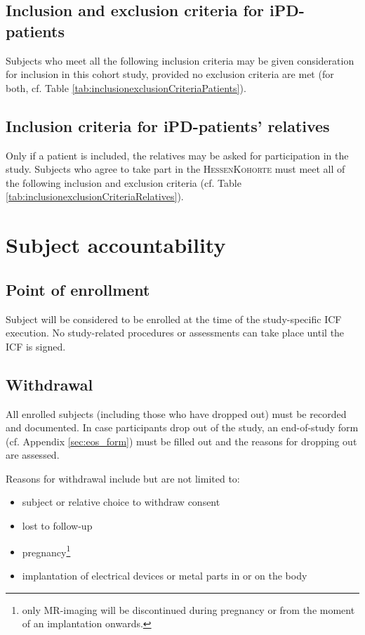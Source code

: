 \subsection{Inclusion and exclusion criteria for \ac{iPD}-patients}
\label{sec:inclusion_criteriaIPS}
Subjects who meet all the following inclusion criteria may be given consideration for inclusion in this cohort study, provided no exclusion criteria are met (for both, cf. Table \ref{tab:inclusionexclusionCriteriaPatients}).


\subsection{Inclusion criteria for \ac{iPD}-patients' relatives}
\label{sec:inclusion_criteriaREL}
Only if a patient is included, the relatives may be asked for participation in the study. Subjects who agree to take part in the \textsc{HessenKohorte} must meet all of the following inclusion and exclusion criteria (cf. Table  \ref{tab:inclusionexclusionCriteriaRelatives}).


\section{Subject accountability}
\subsection{Point of enrollment}
Subject will be considered to be enrolled at the time of the study-specific \ac{ICF} execution. No study-related procedures or assessments can take place until the \ac{ICF} is signed.

\subsection{Withdrawal}
All enrolled subjects (including those who have dropped out) must be recorded and documented. In case participants drop out of the study, an end-of-study form (cf. Appendix \ref{sec:eos_form}) must be filled out and the reasons for dropping out are assessed. 

Reasons for withdrawal include but are not limited to:
\begin{itemize}
  \item subject or relative choice to withdraw consent
  \item lost to follow-up
  \item pregnancy\footnote{\label{note1} only MR-imaging will be discontinued during pregnancy or from the moment of an implantation onwards.}
  \item implantation of electrical devices or metal parts in or on the body
\end{itemize}

